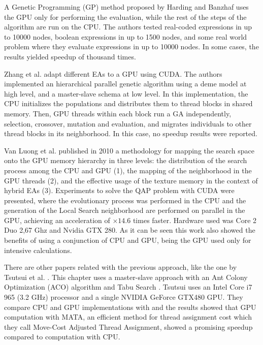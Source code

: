 \documentclass[review]{elsarticle}
\begin{document}
A Genetic Programming (GP) method proposed by Harding and Banzhaf \cite{4215552} uses the GPU only for performing the evaluation, while the rest of the steps of the algorithm are run on the CPU. The authors tested real-coded expressions in up to 10000 nodes, boolean expressions in up to 1500 nodes, and some real world problem where they evaluate expressions in up to 10000 nodes. In some cases, the results yielded speedup of thousand times.

Zhang et al. \cite{ZhangImplementationMasterSlave} adapt different EAs to a GPU using CUDA. The authors implemented an hierarchical parallel genetic algorithm using a deme model at high level, and a master-slave schema at low level. In this implementation, the CPU initializes the populations and distributes them to thread blocks in shared memory. Then, GPU threads within each block run a GA independently, selection, crossover, mutation and evaluation, and migrates individuals to other thread blocks in its neighborhood. In this case, no speedup results were reported.

Van Luong et al. \cite{5586403} published in 2010 a methodology for mapping the search space onto the GPU memory hierarchy in three levels: the distribution of the search process among the CPU and GPU (1), the mapping of the neighborhood in the GPU threads (2), and the effective usage of the texture memory in the context of hybrid EAs (3). Experiments to solve the QAP problem with CUDA were presented, where the evolutionary process was performed in the CPU and the generation of the Local Search neighborhood are performed on parallel in the GPU, achieving an acceleration of $\times14.6$ times faster. Hardware used was Core 2 Duo 2,67 Ghz and Nvidia GTX 280. As it can be seen this work also showed the benefits of using a conjunction of CPU and GPU, being the GPU used only for intensive calculations.

There are other papers related with the previous approach, like the one by Tsutsui et al. \cite{Tsutsui:2011:GECCO}. This chapter uses a master-slave approach with an Ant Colony Optimization (ACO) algorithm \cite{Dorigo:1999:ACO:329055.329062} and Tabu Search \cite{Glover:1997:TS:549765}. Tsutsui uses an Intel Core i7 965 (3.2 GHz) processor and a single NVIDIA GeForce GTX480 GPU. They compare CPU and GPU implementations with and the results showed that GPU computation with MATA, an efficient method for thread assignment cost which they call Move-Cost Adjusted Thread Assignment, showed a promising speedup compared to computation with CPU.
\end{document}
